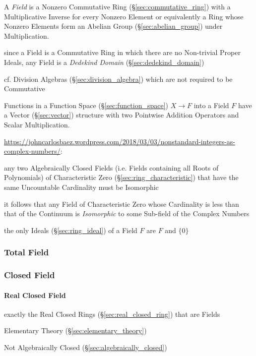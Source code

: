 \begin{itemize}
A \emph{Field} is a Nonzero Commutative Ring
(\S\ref{sec:commutative_ring}) with a Multiplicative Inverse for every
Nonzero Element or equivalently a Ring whose Nonzero Elements form an
Abelian Group (\S\ref{sec:abelian_group}) under Multiplication.

since a Field is a Commutative Ring in which there are no Non-trivial Proper
Ideals, any Field is a \emph{Dedekind Domain} (\S\ref{sec:dedekind_domain})

cf. Division Algebras (\S\ref{sec:division_algebra}) which are not required to
be Commutative

Functions in a Function Space (\S\ref{sec:function_space}) $X
\rightarrow F$ into a Field $F$ have a Vector (\S\ref{sec:vector})
structure with two Pointwise Addition Operators and Scalar
Multiplication.

\url{https://johncarlosbaez.wordpress.com/2018/03/03/nonstandard-integers-as-complex-numbers/}:

any two Algebraically Closed Fields (i.e. Fields containing all Roots of
Polynomials) of Characteristic Zero (\S\ref{sec:ring_characteristic}) that have
the same Uncountable Cardinality must be Isomorphic

it follows that any Field of Characteristic Zero whose Cardinality is less than
that of the Continuum is \emph{Isomorphic} to some Sub-field of the Complex
Numbers

the only Ideals (\S\ref{sec:ring_ideal}) of a Field $F$ are $F$ and $\{0\}$



\subsubsection{Total Field}\label{sec:total_field}

\subsubsection{Closed Field}\label{sec:closed_field}

\paragraph{Real Closed Field}\label{sec:real_closed}\hfill

exactly the Real Closed Rings (\S\ref{sec:real_closed_ring}) that are Fields

Elementary Theory (\S\ref{sec:elementary_theory})

Not Algebraically Closed (\S\ref{sec:algebraically_closed})


\end{itemize}
